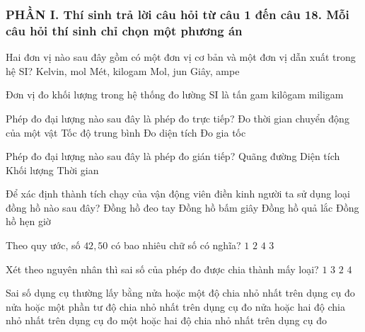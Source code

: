 \subsubsection*{PHẦN I. Thí sinh trả lời câu hỏi từ câu 1 đến câu 18. Mỗi câu hỏi thí sinh chỉ chọn một phương án}
\setcounter{ex}{0}
\begin{ex}%
Hai đơn vị nào sau đây gồm có một đơn vị cơ bản và một đơn vị dẫn xuất trong hệ SI?
\choice
{Kelvin, mol}
{Mét, kilogam}
{\True Mol, jun}
{Giây, ampe}	
\loigiai{
}
\end{ex}
\begin{ex}%
Đơn vị đo khối lượng trong hệ thống đo lường SI là
\choice
{tấn}
{gam}
{\True kilôgam}
{miligam}
\loigiai{

}
\end{ex}
\begin{ex}%
Phép đo đại lượng nào sau đây là phép đo trực tiếp?
\choice
{\True Đo thời gian chuyển động của một vật}
{Tốc độ trung bình}
{Đo diện tích}
{Đo gia tốc}	
\loigiai{

}
\end{ex}
\begin{ex}%
Phép đo đại lượng nào sau đây là phép đo gián tiếp?
\choice
{Quãng đường}
{\True Diện tích}
{Khối lượng}
{Thời gian}
\loigiai{
}
\end{ex}
\begin{ex}%
Để xác định thành tích chạy của vận động viên điền kinh người ta sử dụng loại đồng hồ nào sau đây?
\choice
{Đồng hồ đeo tay}
{\True Đồng hồ bấm giây}
{Đồng hồ quả lắc}
{Đồng hồ hẹn giờ}	
\loigiai{

}
\end{ex}
\begin{ex}%
Theo quy ước, số $42,50$ có bao nhiêu chữ số có nghĩa?
\choice
{$1$}
{$2$}
{\True $4$}
{$3$}
\end{ex}
\begin{ex}%
Xét theo nguyên nhân thì sai số của phép đo được chia thành mấy loại?
\choice
{$1$}
{$3$}
{\True $2$}
{$4$}	
\loigiai{

}
\end{ex}
\begin{ex}%
Sai số dụng cụ thường lấy bằng
\choice
{\True nửa hoặc một độ chia nhỏ nhất trên dụng cụ đo}
{nửa hoặc một phần tư độ chia nhỏ nhất trên dụng cụ đo}
{nửa hoặc hai độ chia nhỏ nhất trên dụng cụ đo}
{một hoặc hai độ chia nhỏ nhất trên dụng cụ đo}	
\loigiai{
}
\end{ex}
